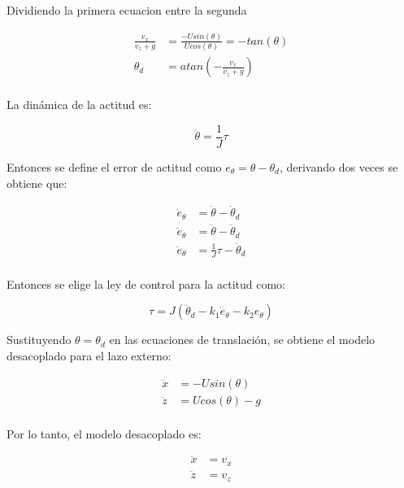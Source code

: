 Dividiendo la primera ecuacion entre la segunda

\begin{equation*}
    \begin{aligned}
        \frac{v_x}{v_z+g}&=\frac{-U sin(\theta)}{U cos(\theta)}=-tan(\theta)\\
        \theta_d&=atan\left(-\frac{v_x}{v_z+g}\right)\\
    \end{aligned}
\end{equation*}

La dinámica de la actitud es:

\begin{equation*}
    \ddot{\theta}=\frac{1}{J}\tau
\end{equation*}

Entonces se define el error de actitud como \(e_\theta=\theta-\theta_d\), derivando dos veces se obtiene que:

\begin{equation*}
    \begin{aligned}
        \dot{e}_\theta&=\dot{\theta}-\dot{\theta}_d\\
        \ddot{e}_\theta&=\ddot{\theta}-\ddot{\theta}_d\\
        \ddot{e}_\theta&=\frac{1}{J}\tau-\ddot{\theta}_d\\
    \end{aligned}
\end{equation*}

Entonces se elige la ley de control para la actitud como:

\begin{equation*}
    \tau=J(\ddot{\theta}_d-k_1\dot{e}_\theta-k_2 e_\theta)
\end{equation*}

Sustituyendo \(\theta=\theta_d\) en las ecuaciones de translación, se obtiene el modelo desacoplado para el lazo externo:

\begin{equation*}
    \begin{aligned}
        \ddot{x}&=-U sin(\theta)\\
        \ddot{z}&=U cos(\theta)-g\\
    \end{aligned}
\end{equation*}

Por lo tanto, el modelo desacoplado es:

\begin{equation*}
    \begin{aligned}
        \ddot{x}&=v_x\\
        \ddot{z}&=v_z\\
    \end{aligned}
\end{equation*}

